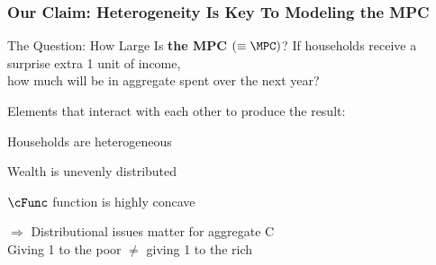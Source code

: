 \begin{frame}\frametitle{Our Claim: Heterogeneity Is Key To Modeling the MPC}

\begin{block}{The Question: How Large Is \textbf{the MPC} $(\equiv \MPC)$?}
If households receive a surprise extra 1 unit of income,\\ how much will be in aggregate spent over the next year?
\end{block}

\begin{block}{Elements that interact with each other to produce the result:}
\bi
\item Households are heterogeneous
\item Wealth is unevenly distributed
\item $\cFunc$ function is highly concave
\item $\Rightarrow$ Distributional issues matter for aggregate C\\
Giving 1 to the poor $\ne$ giving 1 to the rich
\ei
\end{block}
\end{frame}
